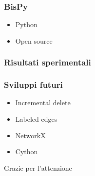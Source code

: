 \documentclass{beamer}
\begin{document}
\begin{frame}
    \frametitle{BisPy}
    \begin{itemize}
        \item Python
        \item Open source
    \end{itemize}
\end{frame}

\begin{frame}
    \frametitle{Risultati sperimentali}
\end{frame}

\begin{frame}
    \frametitle{Sviluppi futuri}
    \begin{itemize}
        \item Incremental delete
        \item Labeled edges
        \item NetworkX
        \item Cython
    \end{itemize}
\end{frame}

\begin{frame}
    Grazie per l'attenzione
\end{frame}
\end{document}
